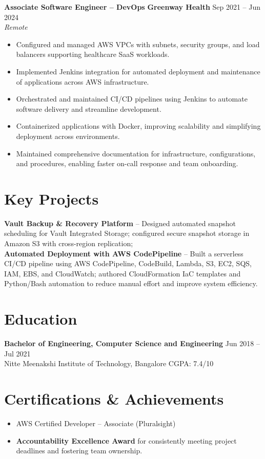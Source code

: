\documentclass[letterpaper,10.5pt]{article}
\newcommand{\role}[4]{%
  \noindent\textbf{#1} \textbar{} \textbf{#2} \hfill #3\\
  \textit{#4}\vspace{2pt}
}
\begin{document}
\role{Associate Software Engineer -- DevOps}{Greenway Health}{Sep 2021 -- Jun 2024}{Remote}
\begin{itemize}
    \item Configured and managed AWS VPCs with subnets, security groups, and load balancers supporting healthcare SaaS workloads.
    \item Implemented Jenkins integration for automated deployment and maintenance of applications across AWS infrastructure.
    \item Orchestrated and maintained CI/CD pipelines using Jenkins to automate software delivery and streamline development.
    \item Containerized applications with Docker, improving scalability and simplifying deployment across environments.
    \item Maintained comprehensive documentation for infrastructure, configurations, and procedures, enabling faster on-call response and team onboarding.
\end{itemize}

\section*{Key Projects}
\textbf{Vault Backup \& Recovery Platform} -- Designed automated snapshot scheduling for Vault Integrated Storage; configured secure snapshot storage in Amazon S3 with cross-region replication;\\[2pt]
\textbf{Automated Deployment with AWS CodePipeline} -- Built a serverless CI/CD pipeline using AWS CodePipeline, CodeBuild, Lambda, S3, EC2, SQS, IAM, EBS, and CloudWatch; authored CloudFormation IaC templates and Python/Bash automation to reduce manual effort and improve system efficiency.\\[2pt]

\section*{Education}
\textbf{Bachelor of Engineering, Computer Science and Engineering} \hfill Jun 2018 -- Jul 2021\\
Nitte Meenakshi Institute of Technology, Bangalore \textbar{} CGPA: 7.4/10

\section*{Certifications \& Achievements}
\begin{itemize}
    \item AWS Certified Developer -- Associate (Pluralsight)
    \item \textbf{Accountability Excellence Award} for consistently meeting project deadlines and fostering team ownership.
\end{itemize}
\end{document}
